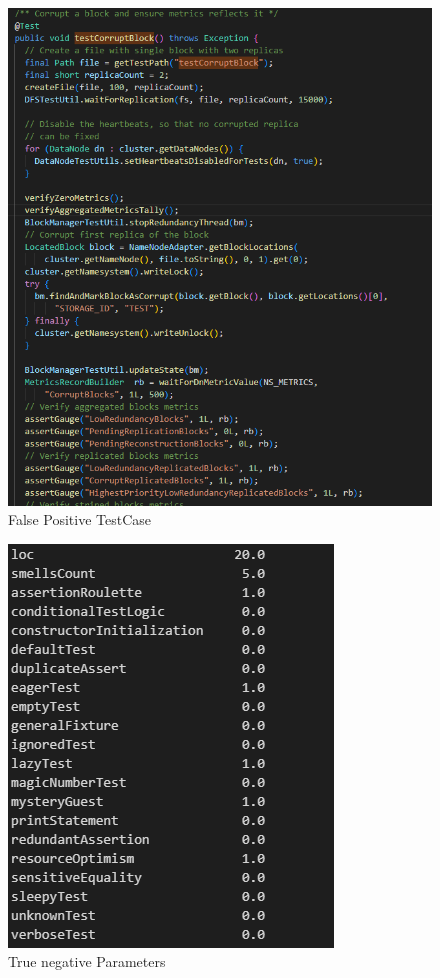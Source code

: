 \documentclass[sigconf,review]{acmart}
\begin{document}
\begin{figure}
    \centering
    \includegraphics[scale=0.3]{ConfusionMatrix/fptest.png}
    \caption{False Positive TestCase}
    \label{fig:my_label}
\end{figure}

\begin{figure}
    \centering
    \includegraphics[scale=0.5]{ConfusionMatrix/tnpara.png}
    \caption{True negative Parameters}
    \label{fig:my_label}
\end{figure}
\end{document}
